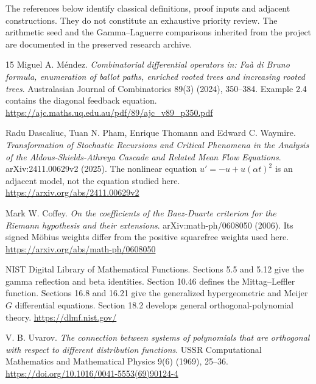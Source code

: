 \label{references}
The references below identify classical definitions, proof inputs and adjacent
constructions. They do not constitute an exhaustive priority review. The
arithmetic seed and the Gamma--Laguerre comparisons inherited from the
project are documented in the preserved research archive.

\begingroup
\makeatletter
{}
\makeatother
\begin{thebibliography}{15}
\setlength{\itemsep}{11pt}
\setlength{\parskip}{3pt}
 Miguel A. Méndez.
\emph{Combinatorial differential operators in: Faà di Bruno formula,
enumeration of ballot paths, enriched rooted trees and increasing rooted trees}.
Australasian Journal of Combinatorics 89(3) (2024), 350--384.
Example 2.4 contains the diagonal feedback equation.
\url{https://ajc.maths.uq.edu.au/pdf/89/ajc_v89_p350.pdf}

 Radu Dascaliuc, Tuan N. Pham, Enrique Thomann and Edward C. Waymire.
\emph{Transformation of Stochastic Recursions and Critical Phenomena in the
Analysis of the Aldous-Shields-Athreya Cascade and Related Mean Flow Equations}.
arXiv:2411.00629v2 (2025).
The nonlinear equation $u'=-u+u(\alpha t)^2$ is an adjacent model, not the
equation studied here.
\url{https://arxiv.org/abs/2411.00629v2}

 Mark W. Coffey.
\emph{On the coefficients of the Baez-Duarte criterion for the Riemann
hypothesis and their extensions}. arXiv:math-ph/0608050 (2006).
Its signed Möbius weights differ from the positive squarefree weights used here.
\url{https://arxiv.org/abs/math-ph/0608050}

 NIST Digital Library of Mathematical Functions.
Sections 5.5 and 5.12 give the gamma reflection and beta identities.
Section 10.46 defines the Mittag--Leffler function. Sections 16.8 and 16.21
give the generalized hypergeometric and Meijer $G$ differential equations.
Section 18.2 develops general orthogonal-polynomial theory.
\url{https://dlmf.nist.gov/}

 V. B. Uvarov.
\emph{The connection between systems of polynomials that are orthogonal
with respect to different distribution functions}.
USSR Computational Mathematics and Mathematical Physics 9(6) (1969), 25--36.
\url{https://doi.org/10.1016/0041-5553(69)90124-4}


\end{thebibliography}
